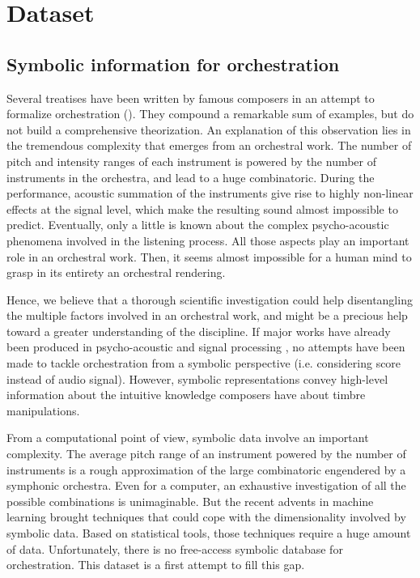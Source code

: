 \documentclass[twoside,twocolumn]{article}
\begin{document}
\section{Dataset}
\subsection{Symbolic information for orchestration}
Several treatises have been written by famous composers in an attempt to formalize orchestration (\cite{koechli_orch,piston-orch,Rimsky-Korsakov:1873aa}).
They compound a remarkable sum of examples, but do not build a comprehensive theorization.
An explanation of this observation lies in the tremendous complexity that emerges from an orchestral work. The number of pitch and intensity ranges of each instrument is powered by the number of instruments in the orchestra, and lead to a huge combinatoric. During the performance, acoustic summation of the instruments give rise to highly non-linear effects at the signal level, which make the resulting sound almost impossible to predict. Eventually, only a little is known about the complex psycho-acoustic phenomena involved in the listening process. All those aspects play an important role in an orchestral work. Then, it seems almost impossible for a human mind to grasp in its entirety an orchestral rendering.

Hence, we believe that a thorough scientific investigation could help disentangling the multiple factors involved in an orchestral work, and might be a precious help toward a greater understanding of the discipline.
If major works have already been produced in psycho-acoustic \cite{mcadams2013timbre,pressnitzer2000perception,tardieu2012perception} and signal processing \cite{peeters2011timbre}, no attempts have been made to tackle orchestration from a symbolic perspective (i.e. considering score instead of audio signal).
However, symbolic representations convey high-level information about the intuitive knowledge composers have about timbre manipulations.

From a computational point of view, symbolic data involve an important complexity.
The average pitch range of an instrument powered by the number of instruments is a rough approximation of the large combinatoric engendered by a symphonic orchestra. Even for a computer, an exhaustive investigation of all the possible combinations is unimaginable.
But the recent advents in machine learning brought techniques that could cope with the dimensionality involved by symbolic data.
Based on statistical tools, those techniques require a huge amount of data. Unfortunately, there is no free-access symbolic database for orchestration.
This dataset is a first attempt to fill this gap.
\end{document}
